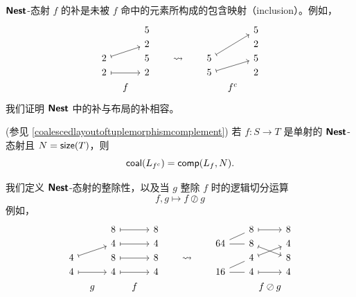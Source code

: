 ${\boldsymbol{\mathsf{Nest}}}$-态射 $f$ 的补是未被 $f$ 命中的元素所构成的包含映射（inclusion）。例如，
\[\begin{tikzcd}[row sep = 1, column sep = 8]
 & & 5 & & & & & & 5\\
 & & 2 & & & & & & 2\\
 2 \ar[urr,mapsto] & & 5 & & \rightsquigarrow &  & 5 \ar[uurr,mapsto] & & 5\\
 2 \ar[rr,mapsto] & & 2 & & & &  5 \ar[urr,mapsto]  & & 2\\
    & f & & & & & &  f^c & 
\end{tikzcd}\]
我们证明 ${\boldsymbol{\mathsf{Nest}}}$ 中的补与布局的补相容。
\begin{mainthm}(参见 \ref{coalescedlayoutoftuplemorphismcomplement}) 若 $f:S \to T$ 是单射的 ${\boldsymbol{\mathsf{Nest}}}$-态射且 $N = \mathsf{size}(T)$，则
\[
\mathsf{coal}(L_{f^c}) = \mathsf{comp}(L_f,N).
\]
\end{mainthm} 

我们定义 ${\boldsymbol{\mathsf{Nest}}}$-态射的整除性，以及当 $g$ 整除 $f$ 时的逻辑切分运算
\[
f,g \mapsto f \oslash g
\]
例如，
\[\begin{tikzcd}[row sep = 1, column sep = 8]
  & & 8 \ar[rr,mapsto] & & 8 & & & & & &  8 \ar[rr,mapsto]  & & 8\\
  & & 4 \ar[rr,mapsto] & & 4 & & & & 64 \ar[rr,-] \ar[urr,-]& &  8 \ar[drr,mapsto] & & 4\\
4 \ar[urr,mapsto] & & 8 \ar[rr,mapsto] & & 8 & & \rightsquigarrow & &  & &  4 \ar[urr,mapsto] & & 8\\
4 \ar[rr,mapsto] & & 4 \ar[rr,mapsto] & & 4 & & & & 16 \ar[rr,-] \ar[urr,-]& & 4 \ar[rr,mapsto] & & 4\\
  & g &  & f & & & & & & & & \mathclap{f \oslash g} & 
\end{tikzcd}\]

